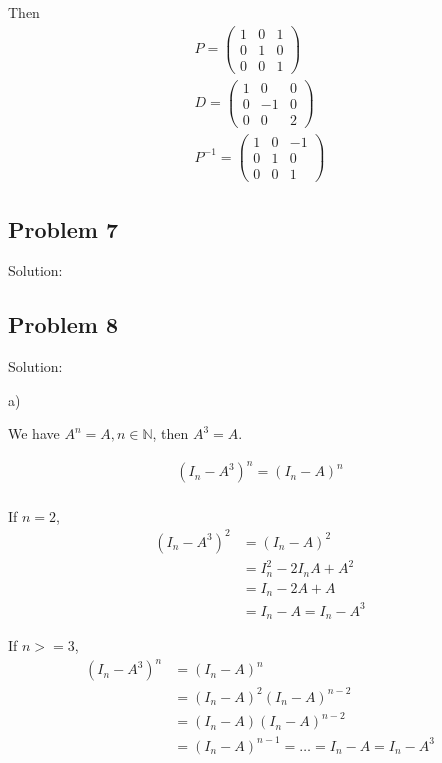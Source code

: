 \documentclass[letterpaper, 11pt]{article}
\newcommand{\1}{\mathds{1}}	%
\theoremstyle{definition}
\begin{document}
Then \begin{align*}
    P = \begin{pmatrix}
            1 & 0 & 1 \\
            0 & 1 & 0 \\
            0 & 0 & 1
        \end{pmatrix} \\
    D = \begin{pmatrix}
            1 & 0  & 0 \\
            0 & -1 & 0 \\
            0 & 0  & 2
        \end{pmatrix} \\
    P ^{-1} = \begin{pmatrix}
                  1 & 0 & -1 \\
                  0 & 1 & 0  \\
                  0 & 0 & 1
              \end{pmatrix}
\end{align*}

\subsection*{Problem 7}
Solution:

\subsection*{Problem 8}

Solution:

a)

We have $A ^{n} = A, n \in \mathbb{N}$, then $A ^{3} = A$.

\begin{align*}
    (I_{n}-A ^{3})^{n} = (I_{n}-A)^{n} \\
\end{align*}

If $n = 2$, \begin{align*}
    (I_{n}-A ^{3})^{2} & = (I_{n}-A)^{2}              \\
                       & = I_{n}^{2}-2I_{n}A + A ^{2} \\
                       & = I_{n} - 2A+A               \\
                       & = I_{n}-A = I_{n}-A ^{3}
\end{align*}

If $n >=3$, \begin{align*}
    (I_{n}-A ^{3})^{n} & = (I_{n}-A)^{n}                                    \\
                       & = (I_{n}-A)^{2}(I_{n}-A)^{n-2}                     \\
                       & = (I_{n}-A)(I_{n}-A)^{n-2}                         \\
                       & = (I_{n}-A)^{n-1} = \dots = I_{n}-A = I_{n}-A ^{3}
\end{align*}
\end{document}
